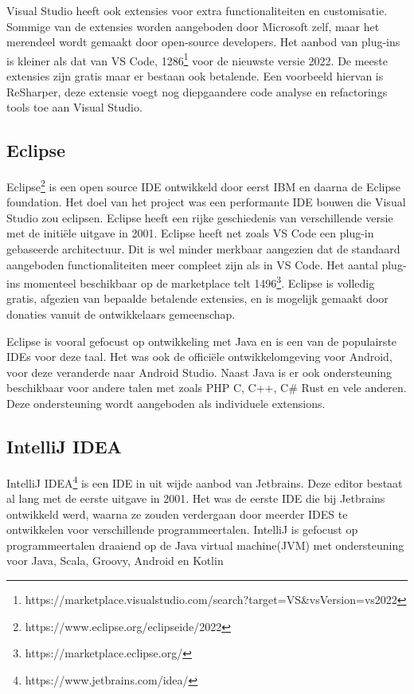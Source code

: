 Visual Studio heeft ook extensies voor extra functionaliteiten en customisatie. Sommige van de extensies worden aangeboden door Microsoft zelf, maar het merendeel wordt gemaakt door open-source developers. Het aanbod van plug-ins is kleiner als dat van VS Code, 1286\footnote{https://marketplace.visualstudio.com/search?target=VS\&vsVersion=vs2022} voor de nieuwste versie 2022. De meeste extensies zijn gratis maar er bestaan ook betalende. Een voorbeeld hiervan is ReSharper, deze extensie voegt nog diepgaandere code analyse en refactorings tools toe aan Visual Studio.

\subsection{Eclipse}
Eclipse\footnote{https://www.eclipse.org/eclipseide/2022} is een open source IDE ontwikkeld door eerst IBM en daarna de Eclipse foundation. Het doel van het project was een performante IDE bouwen die Visual Studio zou eclipsen. Eclipse heeft een rijke geschiedenis van verschillende versie met de initiële uitgave in 2001. Eclipse heeft net zoals VS Code een plug-in gebaseerde architectuur. Dit is wel minder merkbaar aangezien dat de standaard aangeboden functionaliteiten meer compleet zijn als in VS Code. Het aantal plug-ins momenteel beschikbaar op de marketplace telt 1496\footnote{https://marketplace.eclipse.org/}. Eclipse is volledig gratis, afgezien van bepaalde betalende extensies, en is mogelijk gemaakt door donaties vanuit de ontwikkelaars gemeenschap.

Eclipse is vooral gefocust op ontwikkeling met Java en is een van de populairste IDEs voor deze taal. Het was ook de officiële ontwikkelomgeving voor Android, voor deze veranderde naar Android Studio. Naast Java is er ook ondersteuning beschikbaar voor andere talen met zoals PHP C, C++, C\# Rust en vele anderen. Deze ondersteuning wordt aangeboden als individuele extensions.

\newpage

\subsection{IntelliJ IDEA}
IntelliJ IDEA\footnote{https://www.jetbrains.com/idea/} is een IDE in uit wijde aanbod van Jetbrains. Deze editor bestaat al lang met de eerste uitgave in 2001. Het was de eerste IDE die bij Jetbrains ontwikkeld werd,  waarna ze zouden verdergaan door meerder IDES te ontwikkelen voor verschillende programmeertalen. IntelliJ is gefocust op programmeertalen draaiend op de Java virtual machine(JVM) met ondersteuning voor Java, Scala, Groovy, Android en Kotlin

